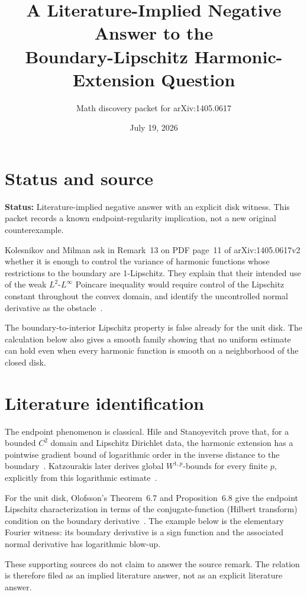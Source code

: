 \documentclass[11pt]{article}
\title{A Literature-Implied Negative Answer to the\\
Boundary-Lipschitz Harmonic-Extension Question}
\author{Math discovery packet for arXiv:1405.0617}
\date{July 19, 2026}
\begin{document}
\maketitle

\section{Status and source}

\textbf{Status:} Literature-implied negative answer with an explicit disk witness.
This packet records a known endpoint-regularity implication, not a new original
counterexample.

Kolesnikov and Milman ask in Remark~13 on PDF page~11 of
arXiv:1405.0617v2 whether it is enough to control the variance of harmonic
functions whose restrictions to the boundary are 1-Lipschitz.  They
explain that their intended use of the weak \(L^2\)-\(L^\infty\) Poincare
inequality would require control of the Lipschitz constant throughout the
convex domain, and identify the uncontrolled normal derivative as the
obstacle~\cite{KM}.

The boundary-to-interior Lipschitz property is false already for the unit disk.
The calculation below also gives a smooth family showing that no uniform
estimate can hold even when every harmonic function is smooth on a
neighborhood of the closed disk.

\section{Literature identification}

The endpoint phenomenon is classical.  Hile and Stanoyevitch prove that, for a
bounded \(C^2\) domain and Lipschitz Dirichlet data, the harmonic extension has
a pointwise gradient bound of logarithmic order in the inverse distance to the
boundary~\cite[Theorem~2]{HS}.  Katzourakis later derives global
\(W^{1,p}\)-bounds for every finite \(p\), explicitly from this logarithmic
estimate~\cite{Katz}.

For the unit disk, Olofsson's Theorem~6.7 and Proposition~6.8 give the
endpoint Lipschitz characterization in terms of the conjugate-function (Hilbert
transform) condition on the boundary derivative~\cite{Olofsson}.  The example
below is the elementary Fourier witness: its boundary derivative is a sign
function and the associated normal derivative has logarithmic blow-up.

These supporting sources do not claim to answer the source remark.
The relation is therefore filed as an implied literature answer, not as an
explicit literature answer.
\end{document}
